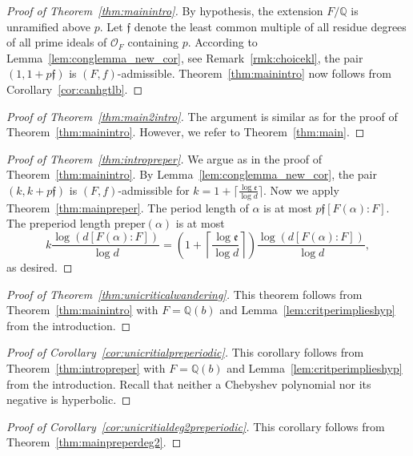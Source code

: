 \documentclass[12pt,oneside,a4]{amsart}
\newcommand{\IQ}{\mathbb{Q}}
\newcommand{\cO}{\mathcal{O}}
\numberwithin{maincounter}{section}
\numberwithin{equation}{section}
\begin{document}
\begin{proof}[Proof of Theorem~\ref{thm:mainintro}]
  By hypothesis,
  the extension $F/\IQ$ is unramified above $p$.
  Let $\mathfrak f$ denote the least common multiple of all residue
  degrees of all prime ideals of $\cO_F$ containing $p$. 
  According to Lemma~\ref{lem:conglemma_new_cor}, see
  Remark~\ref{rmk:choicekl}, the pair $(1,1+p\mathfrak f)$ is 
  $(F,f)$-admissible. Theorem~\ref{thm:mainintro} now follows from
  Corollary~\ref{cor:canhgtlb}.
\end{proof}

\begin{proof}[Proof of Theorem~\ref{thm:main2intro}]
  The argument is similar as for the proof of
  Theorem~\ref{thm:mainintro}. However, we refer to
  Theorem~\ref{thm:main}. 
\end{proof}

\begin{proof}[Proof of Theorem~\ref{thm:intropreper}]
  We argue as in the proof of Theorem~\ref{thm:mainintro}.
  By Lemma~\ref{lem:conglemma_new_cor},
  the pair $(k,k+p\mathfrak f)$ is
  $(F,f)$-admissible for $k=1+\lceil \frac{\log\mathfrak{e}}{\log d}\rceil$.
  Now we apply
  Theorem~\ref{thm:mainpreper}.
  The period length of $\alpha$ is at most $p\mathfrak f
  [F(\alpha):F]$.
  The preperiod length $\mathrm{preper}(\alpha)$ is at most
  \begin{equation*}
    k \frac{\log(d[F(\alpha):F])}{\log
      d} = \left(1+\left\lceil \frac{\log\mathfrak{e}}{\log d}\right\rceil\right)\frac{\log(d[F(\alpha):F])}{\log
      d},
  \end{equation*}
  as desired.
\end{proof}

\begin{proof}[Proof of Theorem~\ref{thm:unicriticalwandering}]
  This theorem follows from Theorem~\ref{thm:mainintro} with
  $F=\IQ(b)$ and
  Lemma~\ref{lem:critperimplieshyp} from the introduction.
\end{proof}

\begin{proof}[Proof of Corollary~\ref{cor:unicritialpreperiodic}]
  This corollary follows from Theorem~\ref{thm:intropreper} with
  $F=\IQ(b)$ and
  Lemma~\ref{lem:critperimplieshyp} from the introduction.
  Recall that neither a Chebyshev polynomial nor its negative is
  hyperbolic. 
\end{proof}

\begin{proof}[Proof of Corollary~\ref{cor:unicritialdeg2preperiodic}]
  This corollary follows from Theorem~\ref{thm:mainpreperdeg2}.
\end{proof}
\end{document}
